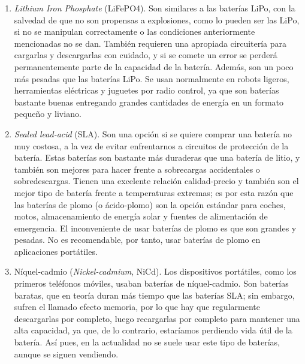 \documentclass[12pt]{article}
\begin{document}
\begin{enumerate}
		\item \textit{Lithium Iron Phosphate} (LiFePO4). Son similares a las baterías LiPo, con la salvedad de que no son propensas a explosiones, como lo pueden ser las LiPo, si no se manipulan correctamente o las condiciones anteriormente mencionadas no se dan. También requieren una apropiada circuitería para cargarlas y descargarlas con cuidado, y si se comete un error se perderá permanentemente parte de la capacidad de la batería. Además, son un poco más pesadas que las baterías LiPo. Se usan normalmente en robots ligeros, herramientas eléctricas y juguetes por radio control, ya que son baterías bastante buenas entregando grandes cantidades de energía en un formato pequeño y liviano.
		
		\item \textit{Sealed lead-acid} (SLA). Son una opción si se quiere comprar una batería no muy costosa, a la vez de evitar enfrentarnos a circuitos de protección de la batería. Estas baterías son bastante más duraderas que una batería de litio, y también son mejores para hacer frente a sobrecargas accidentales o sobredescargas. Tienen una excelente relación calidad-precio y también son el mejor tipo de batería frente a temperaturas extremas; es por esta razón que las baterías de plomo (o ácido-plomo) son la opción estándar para coches, motos, almacenamiento de energía solar y fuentes de alimentación de emergencia. El inconveniente de usar baterías de plomo es que son grandes y pesadas. No es recomendable, por tanto, usar baterías de plomo en aplicaciones portátiles.
		
		\item Níquel-cadmio (\textit{Nickel-cadmium}, NiCd). Los dispositivos portátiles, como los primeros teléfonos móviles, usaban baterías de níquel-cadmio. Son baterías baratas, que en teoría duran más tiempo que las baterías SLA; sin embargo, sufren el llamado efecto memoria, por lo que hay que regularmente descargarlas por completo, luego recargarlas por completo para mantener una alta capacidad, ya que, de lo contrario, estaríamos perdiendo vida útil de la batería. Así pues, en la actualidad no se suele usar este tipo de baterías, aunque se siguen vendiendo.
		

\end{enumerate}
\end{document}
